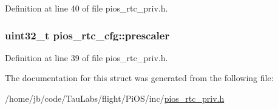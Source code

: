 \-Definition at line 40 of file pios\-\_\-rtc\-\_\-priv.\-h.

\hypertarget{structpios__rtc__cfg_a9ba0d9532d31cd9ff861f59a2d2d7c98}{
\subsubsection[{prescaler}]{\setlength{\rightskip}{0pt plus 5cm}uint32\-\_\-t {\bf pios\-\_\-rtc\-\_\-cfg\-::prescaler}}}\label{structpios__rtc__cfg_a9ba0d9532d31cd9ff861f59a2d2d7c98}


\-Definition at line 39 of file pios\-\_\-rtc\-\_\-priv.\-h.



\-The documentation for this struct was generated from the following file\-:\begin{DoxyCompactItemize}
\item 
/home/jb/code/\-Tau\-Labs/flight/\-Pi\-O\-S/inc/\hyperlink{pios__rtc__priv_8h}{pios\-\_\-rtc\-\_\-priv.\-h}\end{DoxyCompactItemize}
